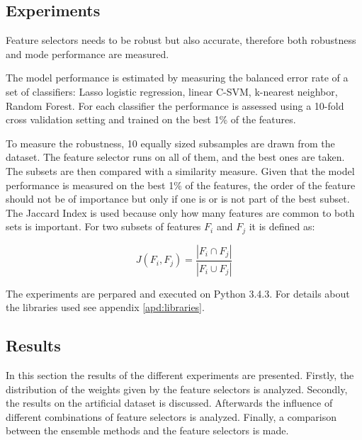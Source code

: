 \documentclass[twoside,11pt]{article}
\begin{document}
\subsection{Experiments}
\label{sec:experiments}

Feature selectors needs to be robust but also accurate, therefore both robustness and mode performance are measured.

The model performance is estimated by measuring the balanced error rate of a set of classifiers: Lasso logistic regression, linear C-SVM, k-nearest neighbor, Random Forest. 
For each classifier the performance is assessed using a 10-fold cross validation setting and trained on the best 1\% of the features.

To measure the robustness, 10 equally sized subsamples are drawn from the dataset. The feature selector runs on all of them, and the best ones are taken. The subsets are then compared with a similarity measure. Given that the model performance is measured on the best 1\% of the features, the order of the feature should not be of importance but only if one is or is not part of the best subset. The Jaccard Index is used because only how many features are common to both sets is important. For two subsets of features $F_i$ and $F_j$ it is defined as:

\begin{equation}
J(F_i, F_j) = \frac{| F_i \cap F_j |}{| F_i \cup F_j |}
\end{equation}

The experiments are perpared and executed on Python 3.4.3. For details about the libraries used see appendix \ref{apd:libraries}.

\subsection{Results}
In this section the results of the different experiments are presented. Firstly, the distribution of the weights given by the feature selectors is analyzed. Secondly, the results on the artificial dataset is discussed. Afterwards the influence of different combinations of feature selectors is analyzed. Finally, a comparison between the ensemble methods and the feature selectors is made.
\end{document}
